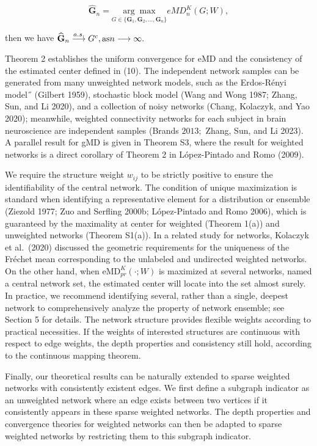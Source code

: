 \documentclass[
  10
]{article}
\begin{document}
\[
\widehat {\mathbf {G}} _ {n} = \underset {G \in \{\mathbf {G} _ {1}, \mathbf {G} _ {2}, \dots , \mathbf {G} _ {n} \}} {\arg \max} e M D _ {n} ^ {K} (G; W),\tag{10}
\]

then we have
\({ \widehat { \bf G } } _ { n } \stackrel { a . s . } { \longrightarrow } G ^ { c } , \mathrm { a s } n \longrightarrow \infty .\)

Theorem 2 establishes the uniform convergence for eMD and the
consistency of the estimated center defined in (10). The independent
network samples can be generated from many unweighted network models,
such as the Erdos-Rényi model˝ (Gilbert 1959), stochastic block model
(Wang and Wong 1987; Zhang, Sun, and Li 2020), and a collection of noisy
networks (Chang, Kolaczyk, and Yao 2020); meanwhile, weighted
connectivity networks for each subject in brain neuroscience are
independent samples (Brands \(2 0 1 3 ;\) Zhang, Sun, and Li 2023). A
parallel result for gMD is given in Theorem S3, where the result for
weighted networks is a direct corollary of Theorem 2 in López-Pintado
and Romo (2009).

We require the structure weight \(w _ { i j }\) to be strictly positive
to ensure the identifiability of the central network. The condition of
unique maximization is standard when identifying a representative
element for a distribution or ensemble (Ziezold 1977; Zuo and Serfling
2000b; López-Pintado and Romo 2006), which is guaranteed by the
maximality at center for weighted (Theorem 1(a)) and unweighted networks
(Theorem S1(a)). In a related study for networks, Kolaczyk et al.~(2020)
discussed the geometric requirements for the uniqueness of the Fréchet
mean corresponding to the unlabeled and undirected weighted networks. On
the other hand, when
\(\mathrm { e M D } _ { p r } ^ { K } ( \cdot ; W )\) is maximized at
several networks, named a central network set, the estimated center will
locate into the set almost surely. In practice, we recommend identifying
several, rather than a single, deepest network to comprehensively
analyze the property of network ensemble; see Section 5 for details. The
network structure provides flexible weights according to practical
necessities. If the weights of interested structures are continuous with
respect to edge weights, the depth properties and consistency still
hold, according to the continuous mapping theorem.

Finally, our theoretical results can be naturally extended to sparse
weighted networks with consistently existent edges. We first define a
subgraph indicator as an unweighted network where an edge exists between
two vertices if it consistently appears in these sparse weighted
networks. The depth properties and convergence theories for weighted
networks can then be adapted to sparse weighted networks by restricting
them to this subgraph indicator.
\end{document}
